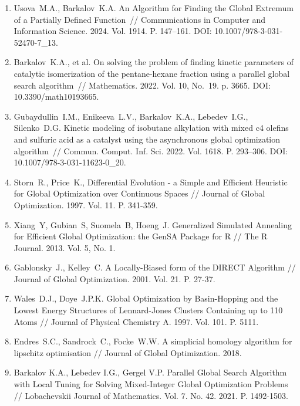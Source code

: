\documentclass[a4paper,12pt,russian]{article}
\begin{document}
\begin{enumerate}
\item \label{rfa:enlit:Usova2024}
Usova~M.A., Barkalov~K.A. An Algorithm for Finding the Global Extremum of a Partially Defined Function~// Communications in Computer and Information Science. 2024. Vol. 1914. P. 147--161. DOI: 10.1007/978-3-031-52470-7{\_}13.

\item \label{rfa:enlit:Barkalov2022}
Barkalov~K.A., et al. On solving the problem of finding kinetic parameters of catalytic isomerization of the pentane-hexane fraction using a parallel global search algorithm~// 
Mathematics. 2022. Vol. 10, No.~19. p. 3665. DOI: 10.3390/math10193665.

\item \label{rfa:enlit:Gubaydullin2022}
Gubaydullin~I.M., Enikeeva~L.V., Barkalov~K.A., Lebedev~I.G., Silenko~D.G. Kinetic modeling of isobutane alkylation with mixed c4 olefins and sulfuric acid as a catalyst using the asynchronous global optimization algorithm~// Commun. Comput. Inf. Sci. 2022. Vol. 1618. P. 293--306. DOI: 10.1007/978-3-031-11623-0{\_}20.

\item \label{rfa:enlit:differential_evolution}
Storn~R., Price~K., Differential Evolution - a Simple and Efficient Heuristic for Global Optimization over Continuous Spaces // Journal of Global Optimization. 1997. Vol. 11. P. 341-359.

\item \label{rfa:enlit:dual_annealing}
Xiang~Y, Gubian~S, Suomela~B, Hoeng~J. Generalized Simulated Annealing for Efficient Global Optimization: the GenSA Package for R // The R Journal. 2013. Vol. 5, No. 1.

\item \label{rfa:enlit:direct}
Gablonsky~J., Kelley~C. A Locally-Biased form of the DIRECT Algorithm // Journal of Global Optimization. 2001. Vol. 21. P. 27-37.

\item \label{rfa:enlit:basinhopping}
Wales~D.J., Doye~J.P.K. Global Optimization by Basin-Hopping and the Lowest Energy Structures of Lennard-Jones Clusters Containing up to 110 Atoms // Journal of Physical Chemistry A. 1997. Vol. 101. P. 5111.

\item \label{rfa:enlit:shgo}
Endres~S.C., Sandrock~C., Focke~W.W. A simplicial homology algorithm for lipschitz optimisation // Journal of Global Optimization. 2018.

\item \label{rfa:enlit:Barkalov2021}
Barkalov K.A., Lebedev I.G., Gergel V.P. Parallel Global Search Algorithm with Local Tuning for Solving Mixed-Integer Global Optimization Problems // Lobachevskii Journal of Mathematics. Vol. 7. No. 42. 2021. P. 1492-1503.


\end{enumerate}
\end{document}
